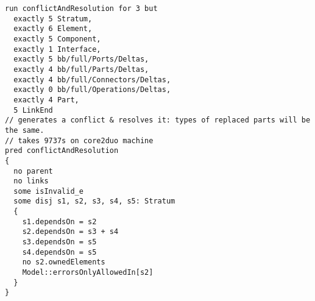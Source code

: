 \lstset{frame=tb, aboveskip=12pt, belowskip=-3pt, breaklines=true, basicstyle=\small\ttfamily, tabsize=2, mathescape=true}
\begin{lstlisting}[caption={unittests\_conflict.als, lines 18-45}, label=alloy:conflictandresolution, captionpos=b]
run conflictAndResolution for 3 but
  exactly 5 Stratum,
  exactly 6 Element,
  exactly 5 Component,
  exactly 1 Interface,
  exactly 5 bb/full/Ports/Deltas,
  exactly 4 bb/full/Parts/Deltas,
  exactly 4 bb/full/Connectors/Deltas,
  exactly 0 bb/full/Operations/Deltas,
  exactly 4 Part,
  5 LinkEnd
// generates a conflict & resolves it: types of replaced parts will be the same.
// takes 9737s on core2duo machine
pred conflictAndResolution
{
  no parent
  no links
  some isInvalid_e
  some disj s1, s2, s3, s4, s5: Stratum
  {
    s1.dependsOn = s2
    s2.dependsOn = s3 + s4
    s3.dependsOn = s5
    s4.dependsOn = s5
    no s2.ownedElements
    Model::errorsOnlyAllowedIn[s2]
  }
}
\end{lstlisting}

